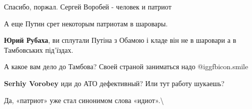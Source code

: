 \begin{itemize}
\begin{itemize} %
Спасибо, поржал. Сергей Воробей - человек и патриот

А еще Путин срет некоторым патриотам в шаровары.

\textbf{Юрий Рубаха}, ви сплутали Путіна з Обамою і кладе він не в шаровари а в Тамбовських під'їздах.

А какое вам дело до Тамбова? Своей страной заниматься надо  @igg{fbicon.smile} 

\textbf{Serhiy Vorobey} иди до АТО дефективный? Или тут работу шукаешь?
\end{itemize} %

Да, «патриот» уже стал синонимом слова «идиот».\textbackslash

\end{itemize} %
